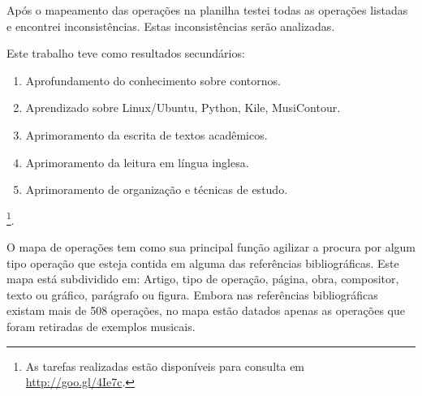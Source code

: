 \documentclass[11pt]{article}
\begin{document}
Após o mapeamento das operações na planilha testei todas as operações
listadas e encontrei inconsistências. Estas inconsistências serão analizadas.

Este trabalho teve como resultados secundários:

\begin{enumerate}
\item Aprofundamento do conhecimento sobre contornos.
\item Aprendizado sobre Linux/Ubuntu, Python, Kile, MusiContour.
\item Aprimoramento da escrita de textos acadêmicos.
\item Aprimoramento da leitura em língua inglesa.
\item Aprimoramento de organização e técnicas de estudo.
\end{enumerate}
\footnote{As
  tarefas realizadas estão disponíveis para consulta em
  \url{http://goo.gl/4Ie7c}.}.

\label{sec:discussao}

O mapa de operações tem como sua principal função agilizar a procura por
algum tipo operação que esteja contida em alguma das referências bibliográficas.
Este mapa está subdividido em: Artigo, tipo de operação, página, obra, compositor,
texto ou gráfico, parágrafo ou figura. Embora nas referências bibliográficas existam
mais de 508 operações, no mapa estão datados apenas as operações que foram retiradas
de exemplos musicais.


\end{document}

